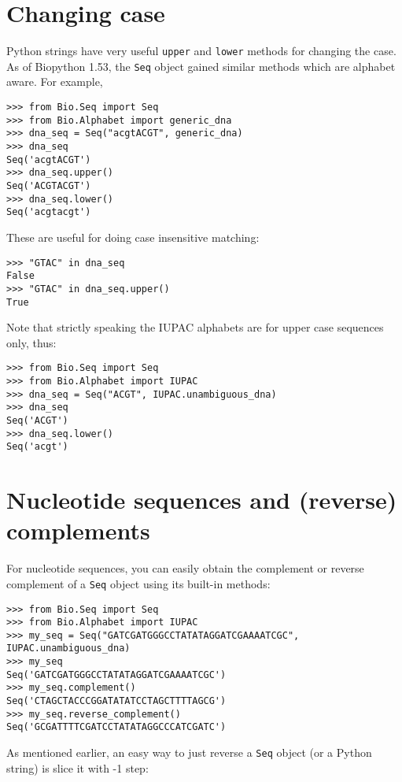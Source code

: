 \section{Changing case}

Python strings have very useful \verb|upper| and \verb|lower| methods for changing the case.
As of Biopython 1.53, the \verb|Seq| object gained similar methods which are alphabet aware.
For example,

\begin{verbatim}
>>> from Bio.Seq import Seq
>>> from Bio.Alphabet import generic_dna
>>> dna_seq = Seq("acgtACGT", generic_dna)
>>> dna_seq
Seq('acgtACGT')
>>> dna_seq.upper()
Seq('ACGTACGT')
>>> dna_seq.lower()
Seq('acgtacgt')
\end{verbatim}

These are useful for doing case insensitive matching:

\begin{verbatim}
>>> "GTAC" in dna_seq
False
>>> "GTAC" in dna_seq.upper()
True
\end{verbatim}

Note that strictly speaking the IUPAC alphabets are for upper case
sequences only, thus:

\begin{verbatim}
>>> from Bio.Seq import Seq
>>> from Bio.Alphabet import IUPAC
>>> dna_seq = Seq("ACGT", IUPAC.unambiguous_dna)
>>> dna_seq
Seq('ACGT')
>>> dna_seq.lower()
Seq('acgt')
\end{verbatim}


\section{Nucleotide sequences and (reverse) complements}
\label{sec:seq-reverse-complement}

For nucleotide sequences, you can easily obtain the complement or reverse
complement of a \verb|Seq| object using its built-in methods:

\begin{verbatim}
>>> from Bio.Seq import Seq
>>> from Bio.Alphabet import IUPAC
>>> my_seq = Seq("GATCGATGGGCCTATATAGGATCGAAAATCGC", IUPAC.unambiguous_dna)
>>> my_seq
Seq('GATCGATGGGCCTATATAGGATCGAAAATCGC')
>>> my_seq.complement()
Seq('CTAGCTACCCGGATATATCCTAGCTTTTAGCG')
>>> my_seq.reverse_complement()
Seq('GCGATTTTCGATCCTATATAGGCCCATCGATC')
\end{verbatim}

As mentioned earlier, an easy way to just reverse a \verb|Seq| object (or a
Python string) is slice it with -1 step:

